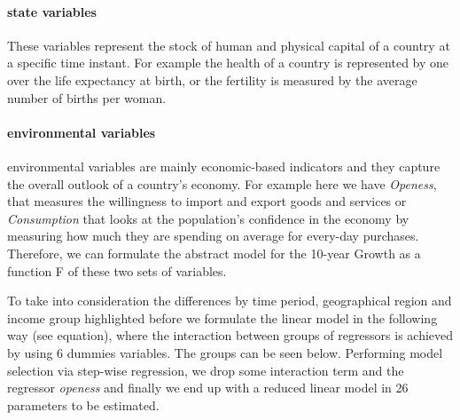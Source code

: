 \documentclass[11pt,a4paper]{article}
\begin{document}
\paragraph{state variables}
These variables represent the stock of human and physical capital of a country at a specific time instant. For example the health of a country is represented by one over the life expectancy at birth, or the fertility is measured by the average number of births per woman.
\paragraph{environmental variables}
environmental variables are mainly economic-based indicators and they capture the overall outlook of a country's economy. For example here we have \textit{Openess}, that measures the willingness to import and export goods and services or \textit{Consumption} that looks at the population's confidence in the economy by measuring how much they are spending on average for every-day purchases.
\\[12pt]

Therefore, we can formulate the abstract model for the 10-year Growth as a function F of these two sets of variables.


To take into consideration the differences by time period, geographical region and income group highlighted before we formulate the linear model in the following way (see equation), where the interaction between groups of regressors is achieved by using 6 dummies variables. The groups can be seen below.
Performing model selection via step-wise regression, we drop some interaction term and the regressor \textit{openess} and finally we end up with a reduced linear model in 26 parameters to be estimated.
\end{document}
